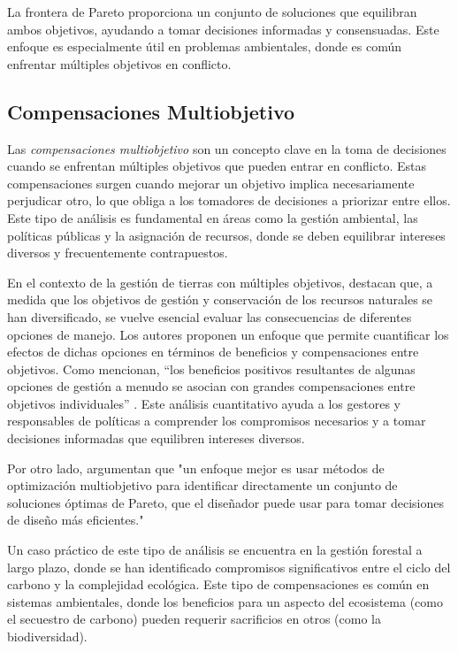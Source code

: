 \documentclass[12pt]{article}
\begin{document}
La frontera de Pareto proporciona un conjunto de soluciones que equilibran ambos objetivos, ayudando a tomar decisiones informadas y consensuadas. Este enfoque es especialmente útil en problemas ambientales, donde es común enfrentar múltiples objetivos en conflicto.

\subsection{Compensaciones Multiobjetivo}

Las \textit{compensaciones multiobjetivo} son un concepto clave en la toma de decisiones cuando se enfrentan múltiples objetivos que pueden entrar en conflicto. Estas compensaciones surgen cuando mejorar un objetivo implica necesariamente perjudicar otro, lo que obliga a los tomadores de decisiones a priorizar entre ellos. Este tipo de análisis es fundamental en áreas como la gestión ambiental, las políticas públicas y la asignación de recursos, donde se deben equilibrar intereses diversos y frecuentemente contrapuestos.

En el contexto de la gestión de tierras con múltiples objetivos, \cite{Bradford2012} destacan que, a medida que los objetivos de gestión y conservación de los recursos naturales se han diversificado, se vuelve esencial evaluar las consecuencias de diferentes opciones de manejo. Los autores proponen un enfoque que permite cuantificar los efectos de dichas opciones en términos de beneficios y compensaciones entre objetivos. Como mencionan, “los beneficios positivos resultantes de algunas opciones de gestión a menudo se asocian con grandes compensaciones entre objetivos individuales” \cite{Bradford2012}. Este análisis cuantitativo ayuda a los gestores y responsables de políticas a comprender los compromisos necesarios y a tomar decisiones informadas que equilibren intereses diversos.

Por otro lado, \cite{Couckuyt2014} argumentan que "un enfoque mejor es usar métodos de optimización multiobjetivo para identificar directamente un conjunto de soluciones óptimas de Pareto, que el diseñador puede usar para tomar decisiones de diseño más eficientes."

Un caso práctico de este tipo de análisis se encuentra en la gestión forestal a largo plazo, donde se han identificado compromisos significativos entre el ciclo del carbono y la complejidad ecológica. Este tipo de compensaciones es común en sistemas ambientales, donde los beneficios para un aspecto del ecosistema (como el secuestro de carbono) pueden requerir sacrificios en otros (como la biodiversidad).
\end{document}
